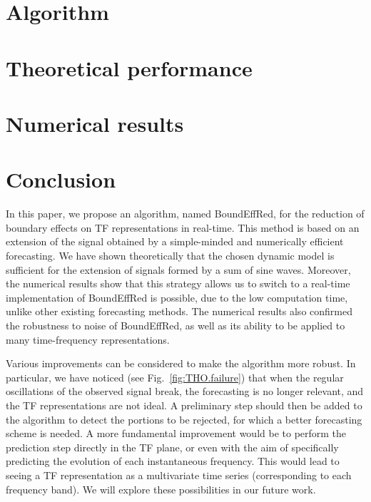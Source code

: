 \documentclass[journal]{IEEEtran}
\begin{document}
\section{Algorithm}
\label{se:algo}



\section{Theoretical performance}
\label{se:theoretical}


\section{Numerical results}
\label{se:results}


\section{Conclusion}
\label{se:conclusion}
In this paper, we propose an algorithm, named {\sf BoundEffRed}, for the reduction of boundary effects on TF representations in real-time. This method is based on an extension of the signal obtained by a simple-minded and numerically efficient forecasting. We have shown theoretically that the chosen dynamic model is sufficient for the extension of signals formed by a sum of sine waves. Moreover, the numerical results show that this strategy allows us to switch to a real-time implementation of {\sf BoundEffRed} is possible, due to the low computation time, unlike other existing forecasting methods. The numerical results also confirmed the robustness to noise of {\sf BoundEffRed}, as well as its ability to be applied to many time-frequency representations. 

Various improvements can be considered to make the algorithm more robust. In particular, we have noticed (see Fig.~\ref{fig:THO.failure}) that when the regular oscillations of the observed signal break, the forecasting is no longer relevant, and the TF representations are not ideal. A preliminary step should then be added to the algorithm to detect the portions to be rejected, for which a better forecasting scheme is needed. A more fundamental improvement would be to perform the prediction step directly in the TF plane, or even with the aim of specifically predicting the evolution of each instantaneous frequency. This would lead to seeing a TF representation as a multivariate time series (corresponding to each frequency band). We will explore these possibilities in our future work.

%





%
\end{document}
